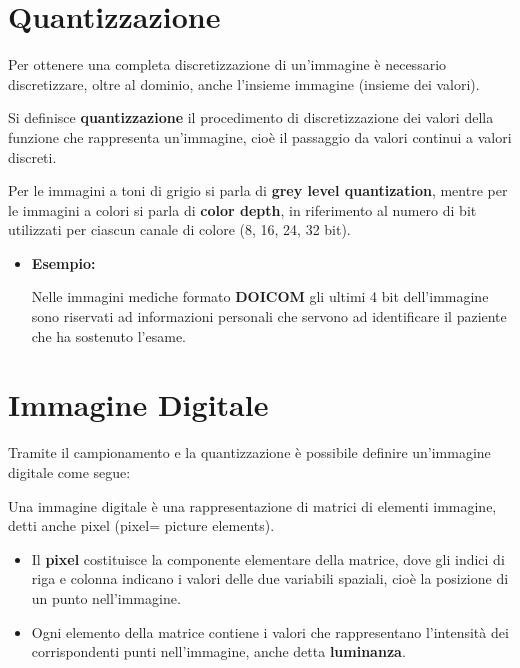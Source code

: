 \section{Quantizzazione}
Per ottenere una completa discretizzazione di un’immagine è
necessario discretizzare, oltre al dominio, anche l’insieme immagine
(insieme dei valori).
\begin{definition}
    Si definisce \textbf{quantizzazione} il procedimento di discretizzazione dei
    valori della funzione che rappresenta un’immagine, cioè il passaggio
    da valori continui a valori discreti.
\end{definition}
Per le immagini a toni di grigio si parla di \textbf{grey level quantization},
mentre per le immagini a colori si parla di \textbf{color depth}, in
riferimento al numero di bit utilizzati per ciascun canale di colore
(8, 16, 24, 32 bit).
\begin{itemize}
    \item \textbf{Esempio:}

          Nelle immagini mediche formato \textbf{DOICOM} gli ultimi 4 bit dell'immagine
          sono riservati ad informazioni personali che servono ad identificare il paziente che ha sostenuto l'esame.
\end{itemize}
\section{Immagine Digitale}
Tramite il campionamento e la quantizzazione è possibile definire
un’immagine digitale come segue:
\begin{definition}
    Una immagine digitale è una rappresentazione di matrici di
    elementi immagine, detti anche pixel (pixel= picture elements).
\end{definition}
\begin{itemize}
    \item Il \textbf{pixel} costituisce la componente elementare della matrice,
          dove gli indici di riga e colonna indicano i valori delle due
          variabili spaziali, cioè la posizione di un punto nell’immagine.
    \item Ogni elemento della matrice contiene i valori che
          rappresentano l’intensità dei corrispondenti punti
          nell’immagine, anche detta \textbf{luminanza}.
\end{itemize}
